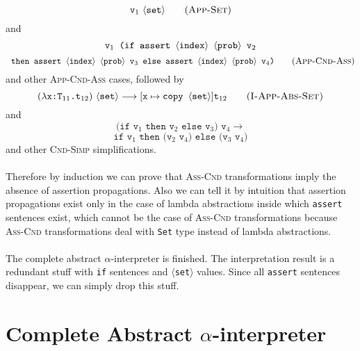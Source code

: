 \documentclass[a4paper]{article}
\begin{document}
\begin{equation}
\text{\tt v$_1$}\ \langle\text{\tt set}\rangle
\tag{\textsc{App-Set}}
\end{equation}
and
$$
\text{\tt v$_1$ } \text{\tt (if assert$\ \langle\text{\tt index}\rangle\ \langle\text{\tt prob}\rangle\ $v$_2$}
$$
\begin{equation}
\texttt{ then assert$\ \langle\text{\tt index}\rangle\ \langle\text{\tt prob}\rangle$ v$_3$ else assert$\ \langle\text{\tt index}\rangle\ \langle\text{\tt prob}\rangle$ v$_4$)}
\tag{\textsc{App-Cnd-Ass}}
\end{equation}
and other \textsc{App-Cnd-Ass} cases, followed by
\begin{equation}
	(\lambda\text{\tt x:T$_{11}$.t$_{12}$})\ \langle\text{\tt set}\rangle\longrightarrow[\text{\tt x}\mapsto\text{\tt copy }\langle\text{\tt set}\rangle]\text{\tt t}_{12}\tag{\sc I-App-Abs-Set}
\end{equation}
and
$$
	\texttt{(if v$_1$ then v$_2$ else v$_3$) v$_4$}\longrightarrow
$$
\begin{equation}
	\texttt{if v$_1$ then (v$_2$ v$_4$) else (v$_3$ v$_4$)}
	\tag{\sc I-Cnd-App-Simp1}
\end{equation}
and other \textsc{Cnd-Simp} simplifications.
\paragraph{}
Therefore by induction we can prove that \textsc{Ass-Cnd} transformations imply the absence of assertion propagations. Also we can tell it by intuition that assertion propagations exist only in the case of lambda abstractions inside which \texttt{assert} sentences exist, which cannot be the case of \textsc{Ass-Cnd} transformations because \textsc{Ass-Cnd} transformations deal with \texttt{Set} type instead of lambda abstractions.
\paragraph{}
The complete abstract $\alpha$-interpreter is finished. The interpretation result is a redundant stuff with \texttt{if} sentences and $\langle$\texttt{set}$\rangle$ values. Since all \texttt{assert} sentences disappear, we can simply drop this stuff.
\section{Complete Abstract $\alpha$-interpreter}
\end{document}
